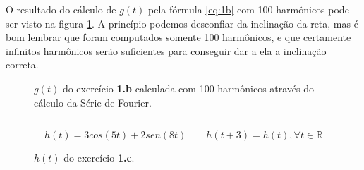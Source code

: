 O resultado do cálculo de $g(t)$ pela fórmula \eqref{eq:1b} com 100 harmônicos pode ser visto na figura \ref{fig:1b-gfs}. A princípio podemos desconfiar da inclinação da reta, mas é bom lembrar que foram computados somente 100 harmônicos, e que certamente infinitos harmônicos serão suficientes para conseguir dar a ela a inclinação correta.

\begin{figure}
  \caption{\small{$g(t)$ do exercício \textbf{1.b} calculada com 100 harmônicos através do cálculo da Série de Fourier.}}
  \label{fig:1b-gfs}
\end{figure}


\subsection{}

\[\displaystyle
h(t) = 3cos(5t)+2sen(8t) \quad \quad h(t+3) = h(t), \forall t \in \mathbb{R}
\]

\begin{figure}
  \caption{\small{$h(t)$ do exercício \textbf{1.c}.}}
  \label{fig:1c-h}
\end{figure}

